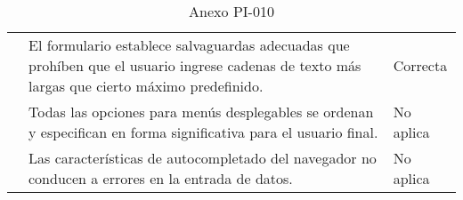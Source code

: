 \begin{table}[htpb]
\begin{tabularx}{\textwidth}{|l|X|l|}
                                      & El formulario establece salvaguardas adecuadas que prohíben que el usuario ingrese cadenas de texto más largas que cierto máximo predefinido.             & Correcta            \\ \cline{2-3} 
                                      & Todas las opciones para menús desplegables se ordenan y especifican en forma significativa para el usuario final.                                         & No aplica           \\ \cline{2-3} 
                                      & Las características de autocompletado del navegador no conducen a errores en la entrada de datos.                                                         & No aplica           \\ \hline
\end{tabularx}
\caption{Anexo PI-010}
\end{table}


